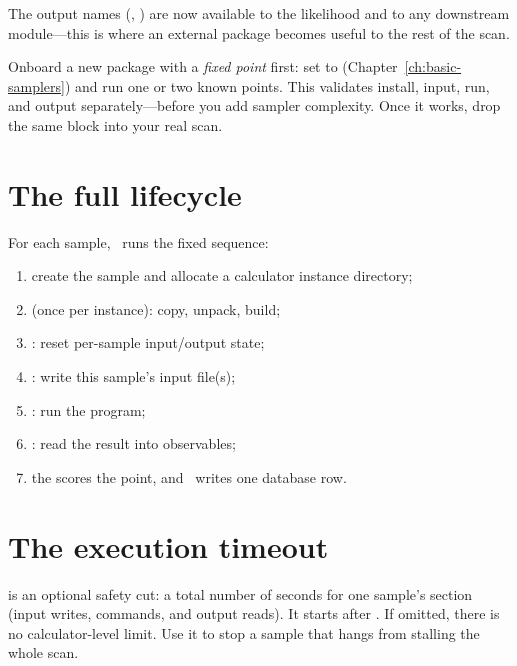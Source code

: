 \noindent The output names (, ) are now available to the likelihood and
to any downstream module---this is where an external package becomes useful to the rest of the
scan.

\begin{jtip}
Onboard a new package with a \emph{fixed point} first: set  to
 (Chapter~\ref{ch:basic-samplers}) and run one or two known points. This validates
install, input, run, and output separately---before you add sampler complexity. Once it works,
drop the same  block into your real scan.
\end{jtip}

\section{The full lifecycle}
\label{sec:calc-lifecycle}

For each sample, \Jarvis\ runs the fixed sequence:

\begin{enumerate}
  \item create the sample and allocate a calculator instance directory;
  \item {} (once per instance): copy, unpack, build;
  \item {}: reset per-sample input/output state;
  \item {}: write this sample's input file(s);
  \item {}: run the program;
  \item {}: read the result into observables;
  \item the  scores the point, and \Jarvis\ writes one database row.
\end{enumerate}

\section{The execution timeout}
\label{sec:calc-timeout}

 is an optional safety cut: a total number of seconds for one sample's
 section (input writes, commands, and output reads). It starts after
. If omitted, there is no calculator-level limit. Use it to stop a sample
that hangs from stalling the whole scan.

